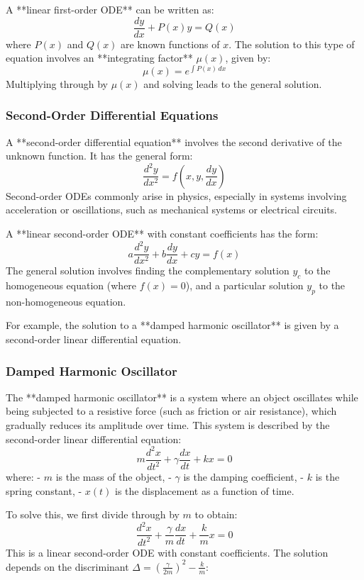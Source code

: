 \documentclass{article}
\begin{document}
A **linear first-order ODE** can be written as:
\[
\frac{dy}{dx} + P(x) y = Q(x)
\]
where \( P(x) \) and \( Q(x) \) are known functions of \( x \). The solution to this type of equation involves an **integrating factor** \( \mu(x) \), given by:
\[
\mu(x) = e^{\int P(x) \, dx}
\]
Multiplying through by \( \mu(x) \) and solving leads to the general solution.

\subsubsection*{Second-Order Differential Equations}

A **second-order differential equation** involves the second derivative of the unknown function. It has the general form:
\[
\frac{d^2y}{dx^2} = f(x, y, \frac{dy}{dx})
\]
Second-order ODEs commonly arise in physics, especially in systems involving acceleration or oscillations, such as mechanical systems or electrical circuits.

A **linear second-order ODE** with constant coefficients has the form:
\[
a \frac{d^2y}{dx^2} + b \frac{dy}{dx} + c y = f(x)
\]
The general solution involves finding the complementary solution \( y_c \) to the homogeneous equation (where \( f(x) = 0 \)), and a particular solution \( y_p \) to the non-homogeneous equation.

For example, the solution to a **damped harmonic oscillator** is given by a second-order linear differential equation.

\subsubsection*{Damped Harmonic Oscillator}

The **damped harmonic oscillator** is a system where an object oscillates while being subjected to a resistive force (such as friction or air resistance), which gradually reduces its amplitude over time. This system is described by the second-order linear differential equation:
\[
m \frac{d^2x}{dt^2} + \gamma \frac{dx}{dt} + kx = 0
\]
where:
- \( m \) is the mass of the object,
- \( \gamma \) is the damping coefficient,
- \( k \) is the spring constant,
- \( x(t) \) is the displacement as a function of time.

To solve this, we first divide through by \( m \) to obtain:
\[
\frac{d^2x}{dt^2} + \frac{\gamma}{m} \frac{dx}{dt} + \frac{k}{m} x = 0
\]
This is a linear second-order ODE with constant coefficients. The solution depends on the discriminant \( \Delta = \left( \frac{\gamma}{2m} \right)^2 - \frac{k}{m} \):
\end{document}
